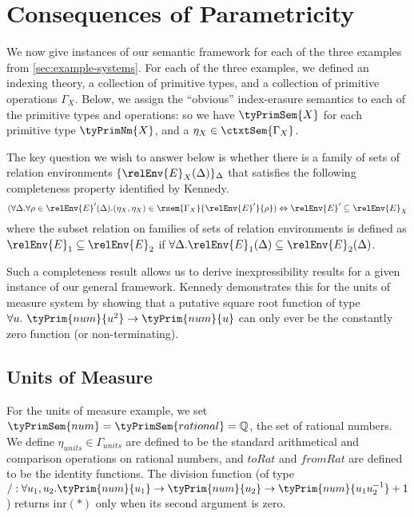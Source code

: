 \section{Consequences of Parametricity}

We now give instances of our semantic framework for each of the three
examples from \autoref{sec:example-systems}. For each of the three
examples, we defined an indexing theory, a collection of primitive
types, and a collection of primitive operations $\Gamma_X$. Below, we
assign the ``obvious'' index-erasure semantics to each of the
primitive types and operations: so we have $\tyPrimSem{X}$ for each
primitive type $\tyPrimNm{X}$, and a $\eta_X \in \ctxtSem{\Gamma_X}$.

The key question we wish to answer below is whether there is a family
of sets of relation environments $\{\relEnv{E}_X(\Delta)\}_{\Delta}$
that satisfies the following completeness property identified by
Kennedy.
\begin{equation}\label{eq:kennedy-completeness}
  (\forall \Delta. \forall \rho \in \relEnv{E}'(\Delta). (\eta_X, \eta_X) \in \rsem{\Gamma_X}{\relEnv{E}'}{\rho}) \Leftrightarrow \relEnv{E}'\subseteq \relEnv{E}_X
\end{equation}
where the subset relation on families of sets of relation environments
is defined as $\relEnv{E}_1 \subseteq \relEnv{E}_2$ if $\forall
\Delta. \relEnv{E}_1(\Delta) \subseteq \relEnv{E}_2(\Delta)$.

Such a completeness result allows us to derive inexpressibility
results for a given instance of our general framework. Kennedy
demonstrates this for the units of measure system by showing that a
putative square root function of type $\forall u.\ \tyPrim{num}{u^2}
\to \tyPrim{num}{u}$ can only ever be the constantly zero function (or
non-terminating).

\subsection{Units of Measure}\label{sec:units-semantics}

For the units of measure example, we set $\tyPrimSem{num} =
\tyPrimSem{rational} = \mathbb{Q}$, the set of rational numbers. We
define $\eta_{\mathit{units}} \in \Gamma_{\mathit{units}}$ are defined
to be the standard arithmetical and comparison operations on rational
numbers, and $\mathit{toRat}$ and $\mathit{fromRat}$ are defined to be
the identity functions. The division function (of type $/ : \forall
u_1,u_2. \tyPrim{num}{u_1} \to \tyPrim{num}{u_2} \to
\tyPrim{num}{u_1u^{-1}_2} + 1$) returns $\mathrm{inr}(*)$ only when
its second argument is zero.

